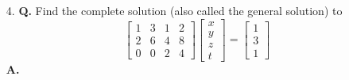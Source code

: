 \documentclass[main.tex]{subfiles}
\begin{document}
\begin{enumerate}
    \item [4.] \textbf{Q.} Find the complete solution (also called the general solution) to
    $$
    \left[\begin{array}{llll}
    1 & 3 & 1 & 2 \\
    2 & 6 & 4 & 8 \\
    0 & 0 & 2 & 4
    \end{array}\right]\left[\begin{array}{l}
    x \\
    y \\
    z \\
    t
    \end{array}\right]=\left[\begin{array}{l}
    1 \\
    3 \\
    1
    \end{array}\right]
    $$
    \textbf{A.}
    

\end{enumerate}
\end{document}
